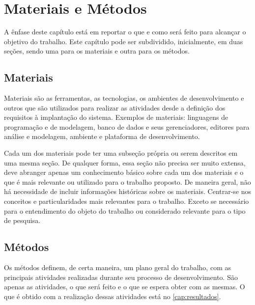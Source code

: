 \chapter{Materiais e Métodos}\label{cap:materialemetodos}

A ênfase deste capítulo está em reportar o que e como será feito para alcançar o objetivo do trabalho. Este capítulo pode ser subdividido, inicialmente, em duas seções, sendo uma para os materiais e outra para os métodos.

\section{Materiais}\label{sec:materiais}

Materiais são as ferramentas, as tecnologias, os ambientes de desenvolvimento e outros que são utilizados para realizar as atividades desde a definição dos requisitos à implantação do sistema. Exemplos de materiais: linguagens de programação e de modelagem, banco de dados e seus gerenciadores, editores para análise e modelagem, ambiente e plataforma de desenvolvimento.

Cada um dos materiais pode ter uma subseção própria ou serem descritos em uma mesma seção. De qualquer forma, essa seção não precisa ser muito extensa, deve abranger apenas um conhecimento básico sobre cada um dos materiais e o que é mais relevante ou utilizado para o trabalho proposto. De maneira geral, não há necessidade de incluir informações históricas sobre os materiais. Centrar-se nos conceitos e particularidades mais relevantes para o trabalho. Exceto se necessário para o entendimento do objeto do trabalho ou considerado relevante para o tipo de pesquisa.

\section{Métodos}\label{sec:metodo}

Os métodos definem, de certa maneira, um plano geral do trabalho, com as principais atividades realizadas durante seu processo de desenvolvimento. São apenas as atividades, o que será feito e o que se espera obter com as mesmas. O que é obtido com a realização dessas atividades está no \autoref{cap:resultados}.

